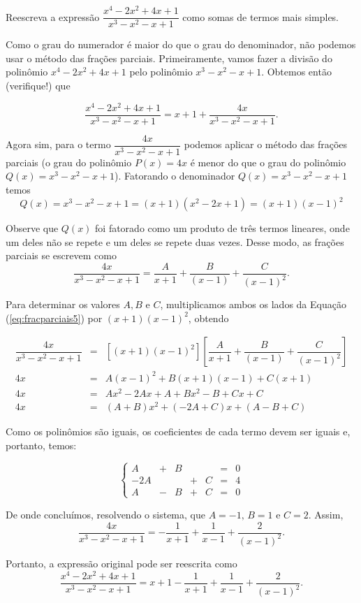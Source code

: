 \begin{exem}
    Reescreva a expressão $\dfrac{x^4 - 2x^2 + 4x + 1}{x^3 - x^2 - x + 1}$ como somas de termos mais simples.

    Como o grau do numerador é maior do que o grau do denominador, não podemos usar o método das frações parciais. Primeiramente, vamos fazer a divisão do polinômio $x^4 - 2x^2 + 4x + 1$ pelo polinômio $x^3 - x^2 - x + 1$. Obtemos então (verifique!) que 

    $$\dfrac{x^4 - 2x^2 + 4x + 1}{x^3 - x^2 - x + 1} = x + 1 + \dfrac{4x}{x^3 - x^2 - x + 1}.$$

    Agora sim, para o termo $\dfrac{4x}{x^3 - x^2 - x + 1}$ podemos aplicar o método das frações parciais (o grau do polinômio $P(x) = 4x$ é menor do que o grau do polinômio $Q(x) = x^3 - x^2 - x + 1$). Fatorando o denominador $Q(x) = x^3 - x^2 - x + 1$ temos $$Q(x) = x^3 - x^2 - x + 1 = (x+1)(x^2 - 2x +1) = (x+1)(x - 1)^2$$

    Observe que $Q(x)$ foi fatorado como um produto de três termos lineares, onde um deles não se repete e um deles se repete duas vezes. Desse modo, as frações parciais se escrevem como 
    \begin{equation}
    \label{eq:fracparciais5}
    \dfrac{4x}{x^3 - x^2 - x + 1} = \dfrac{A}{x+1} + \dfrac{B}{(x-1)} + \dfrac{C}{(x-1)^2}.
    \end{equation}

    Para determinar os valores $A, B$ e $C$, multiplicamos ambos os lados da Equação (\ref{eq:fracparciais5}) por $(x+1)(x-1)^2$, obtendo

    \begin{eqnarray*}
    [(x+1)(x-1)^2]\dfrac{4x}{x^3 - x^2 - x + 1} & = & [(x+1)(x-1)^2] \left[\dfrac{A}{x+1} + \dfrac{B}{(x-1)} + \dfrac{C}{(x-1)^2}\right]\\[5pt]
    4x & =& A(x-1)^2 + B(x+1)(x-1) + C(x+1) \\[5pt]
    4x & =& Ax^2 - 2Ax + A + Bx^2 - B + Cx + C\\[5pt]
    4x & = & (A+B)x^2 + (-2A + C)x + (A - B + C)
    \end{eqnarray*}

    Como os polinômios são iguais, os coeficientes de cada termo devem ser iguais e, portanto, temos:

    \begin{equation*}
    \left\{ \begin{array}{ccccccc} 
    A & + & B &  &  &=& 0 \\[5pt]
    -2A &  &  &  + & C &=& 4\\[5pt]
    A & - & B & + & C &=& 0
    \end{array}
    \right.    
    \end{equation*}

    De onde concluímos, resolvendo o sistema, que $A = -1, \, B = 1$ e $C = 2$. Assim, $$\dfrac{4x}{x^3 - x^2 - x + 1} = -\dfrac{1}{x+1} + \dfrac{1}{x-1} + \dfrac{2}{(x-1)^2}.$$

    Portanto, a expressão original pode ser reescrita como
    $$\dfrac{x^4 - 2x^2 + 4x + 1}{x^3 - x^2 - x + 1} = x + 1 -\dfrac{1}{x+1} + \dfrac{1}{x-1} + \dfrac{2}{(x-1)^2}.$$
 \end{exem}

